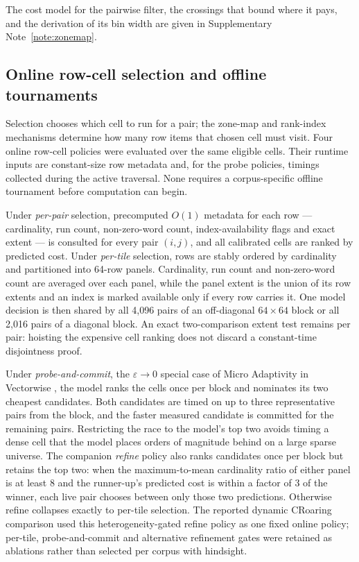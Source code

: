 The cost model for the pairwise filter, the crossings that bound where it pays, and the derivation of
its bin width are given in Supplementary Note~\ref{note:zonemap}.

\subsection*{Online row-cell selection and offline tournaments}

Selection chooses which cell to run for a pair; the zone-map and rank-index mechanisms determine how
many row items that chosen cell must visit. Four online row-cell policies were evaluated over the same
eligible cells. Their runtime inputs are constant-size row metadata and, for the probe policies,
timings collected during the active traversal. None requires a corpus-specific offline tournament
before computation can begin.

Under \emph{per-pair} selection, precomputed $O(1)$ metadata for each row --- cardinality, run count,
non-zero-word count, index-availability flags and exact extent --- is consulted for every pair
$(i,j)$, and all calibrated cells are ranked by predicted cost. Under \emph{per-tile} selection, rows
are stably ordered by cardinality and partitioned into 64-row panels. Cardinality, run count and
non-zero-word count are averaged over each panel, while the panel extent is the union of its row
extents and an index is marked available only if every row carries it. One model decision is then
shared by all 4,096 pairs of an off-diagonal $64\times64$ block or all 2,016 pairs of a diagonal
block. An exact two-comparison extent test remains per pair: hoisting the expensive cell ranking does
not discard a constant-time disjointness proof.

Under \emph{probe-and-commit}, the $\varepsilon\!\to\!0$ special case of Micro Adaptivity in
Vectorwise \cite{raducanu2013microadaptivity}, the model ranks the cells once per block and nominates
its two cheapest candidates. Both candidates are timed on up to three representative pairs from the
block, and the faster measured candidate is committed for the remaining pairs. Restricting the race
to the model's top two avoids timing a dense cell that the model places orders of magnitude behind on
a large sparse universe. The companion \emph{refine} policy also ranks candidates once per block but
retains the top two: when the maximum-to-mean cardinality ratio of either panel is at least 8 and the
runner-up's predicted cost is within a factor of 3 of the winner, each live pair chooses between only
those two predictions. Otherwise refine collapses exactly to per-tile selection. The reported dynamic
CRoaring comparison used this heterogeneity-gated refine policy as one fixed online policy; per-tile,
probe-and-commit and alternative refinement gates were retained as ablations rather than selected
per corpus with hindsight.

